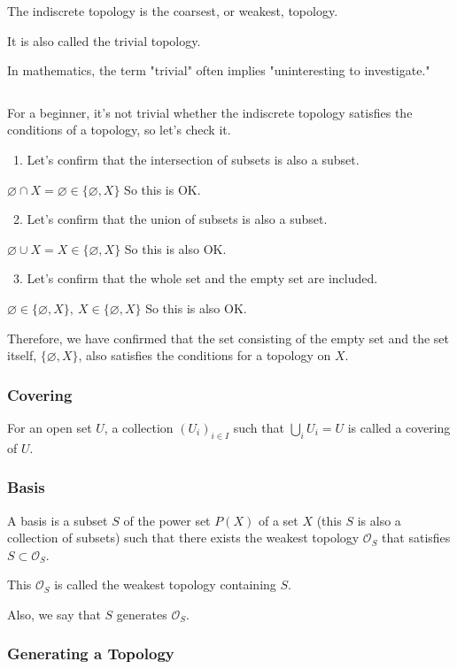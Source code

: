 \documentclass{article}
\begin{document}
The indiscrete topology is the coarsest, or weakest, topology.

It is also called the trivial topology.

In mathematics, the term "trivial" often implies "uninteresting to investigate."

${}$

For a beginner, it's not trivial whether the indiscrete topology satisfies the conditions of a topology, so let's check it.

\ 1. Let's confirm that the intersection of subsets is also a subset.

$\varnothing \cap X = \varnothing \in \{ \varnothing, X \}$
So this is OK.

\ 2. Let's confirm that the union of subsets is also a subset.

$\varnothing \cup X = X \in \{ \varnothing, X \}$
So this is also OK.

\ 3. Let's confirm that the whole set and the empty set are included.

$\varnothing \in \{ \varnothing, X \} , \ X \in \{ \varnothing, X \}$
So this is also OK.

Therefore, we have confirmed that the set consisting of the empty set and the set itself, $\{ \varnothing, X \}$, also satisfies the conditions for a topology on $X$.



\subsubsection{Covering}

For an open set $U$, a collection $(U_{i})_{i \in I}$ such that $\bigcup_{i} U_{i} = U$ is called a covering of $U$.


\subsubsection{Basis}

A basis is a subset $S$ of the power set $P(X)$ of a set $X$
(this $S$ is also a collection of subsets)
such that
there exists the weakest topology ${\mathcal O}_{S}$
that satisfies $S \subset {\mathcal O}_{S}$.

This ${\mathcal O}_{S}$ is
called the weakest topology containing $S$.

Also, we say that $S$ generates ${\mathcal O}_{S}$.

\subsubsection{Generating a Topology}
\end{document}
